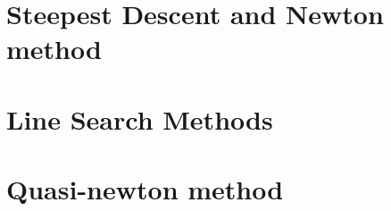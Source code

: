 \documentclass[11pt]{report}
\begin{document}


\section{Steepest Descent and Newton method}

\section{Line Search Methods}

\section{Quasi-newton method}

\end{document}
